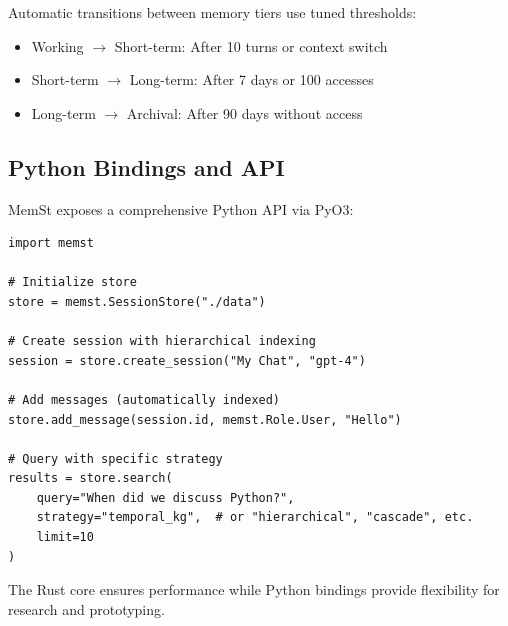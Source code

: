 Automatic transitions between memory tiers use tuned thresholds:
\begin{itemize}
    \item Working $\rightarrow$ Short-term: After 10 turns or context switch
    \item Short-term $\rightarrow$ Long-term: After 7 days or 100 accesses
    \item Long-term $\rightarrow$ Archival: After 90 days without access
\end{itemize}

\subsection{Python Bindings and API}

MemSt exposes a comprehensive Python API via PyO3:

\begin{verbatim}
import memst

# Initialize store
store = memst.SessionStore("./data")

# Create session with hierarchical indexing
session = store.create_session("My Chat", "gpt-4")

# Add messages (automatically indexed)
store.add_message(session.id, memst.Role.User, "Hello")

# Query with specific strategy
results = store.search(
    query="When did we discuss Python?",
    strategy="temporal_kg",  # or "hierarchical", "cascade", etc.
    limit=10
)
\end{verbatim}

The Rust core ensures performance while Python bindings provide flexibility for research and prototyping.
